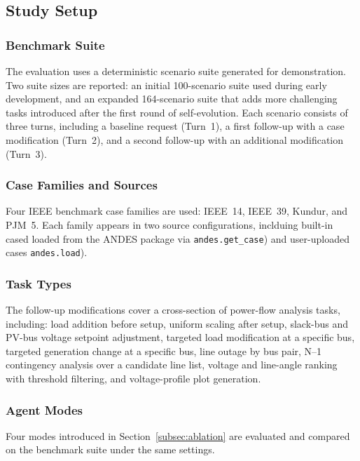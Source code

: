 \documentclass[journal]{IEEEtran}
\begin{document}
\subsection{Study Setup}
\label{subsec:setup}

\subsubsection{Benchmark Suite}

The evaluation uses a deterministic scenario suite generated for demonstration.
Two suite sizes are reported:
an initial 100-scenario suite used during early development, and an expanded 164-scenario suite that adds more challenging tasks introduced after the first round of self-evolution.
Each scenario consists of three turns, including a baseline request (Turn~1), a first follow-up with a case modification (Turn~2), and a second follow-up with an additional modification (Turn~3).

\subsubsection{Case Families and Sources}

Four IEEE benchmark case families are used: IEEE~14, IEEE~39, Kundur, and PJM~5.
Each family appears in two source configurations, inclduing built-in cased  loaded from the ANDES package via \texttt{andes.get\_case}) and user-uploaded cases \texttt{andes.load}).

\subsubsection{Task Types}

The follow-up modifications cover a cross-section of power-flow analysis tasks, including:
load addition before setup, uniform scaling after setup, slack-bus and PV-bus voltage setpoint adjustment, targeted load modification at a specific bus, targeted generation change at a specific bus, line outage by bus pair, N--1 contingency analysis over a candidate line list, voltage and line-angle ranking with threshold filtering, and voltage-profile plot generation.

\subsubsection{Agent Modes}

Four modes introduced in Section~\ref{subsec:ablation} are evaluated and compared on the benchmark suite under the same settings.
\end{document}
